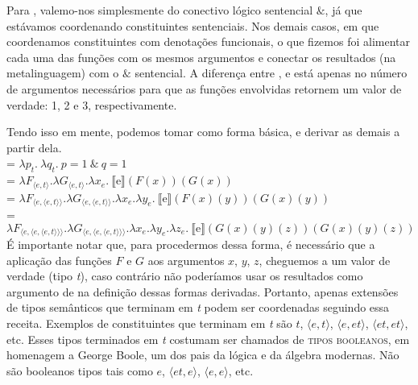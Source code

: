 \n Para , valemo-nos simplesmente do conectivo lógico
sentencial $\&$, já que estávamos coordenando constituintes
sentenciais. Nos demais casos, em que coordenamos constituintes com
denota\-çõ\-es funcionais, o que fizemos foi alimentar cada uma das
fun\-çõ\-es com os mesmos argumentos e conectar os resultados (na
metalinguagem) com o $\&$ sentencial. A diferen\-ça entre
,  e  está apenas no número de
argumentos necessários para que as fun\-çõ\-es
envolvidas retornem um valor de verdade: 1, 2 e 3, respectivamente. 

Tendo isso em mente, podemos tomar  como forma básica, e
derivar as demais a partir dela.\\

\n {} = $\lambda p_{t}.\ \lambda q_{t}.\ p=1\ \&\
q=1$\\

\n {} = $\lambda F_{\langle e,t\rangle}.\lambda G_{\langle
e,t\rangle}.\lambda x_{e}.\ \llbracket \text{e} \rrbracket (F(x))(G(x))$\\

\n {} = $\lambda F_{\langle e,\langle
e,t\rangle\rangle}.\lambda G_{\langle e,\langle
e,t\rangle\rangle}.\lambda x_{e}.\lambda y_{e}.\ \llbracket \text{e} \rrbracket (F(x)(y))(G(x)(y))$\\

\n {} = $\lambda F_{\langle e,\langle e, \langle
e,t\rangle\rangle\rangle}.\lambda G_{\langle e,\langle e, \langle
e,t\rangle\rangle\rangle}.\lambda x_{e}.\lambda y_{e}.\lambda
z_{e}.\ \llbracket \text{e} \rrbracket (G(x)(y)(z))(G(x)(y)(z))$\\

\n É importante notar que, para
procedermos dessa forma, é necessário que a aplicação das funções $F$ e $G$  aos argumentos $x$, $y$, $z$, cheguemos a um valor de verdade (tipo
\textit{t}), caso contrário não poderíamos usar os resultados como argumento de \den{e} na definição dessas formas derivadas. Portanto, apenas extensões de tipos semânticos
que terminam em \textit{t} podem ser coordenadas seguindo essa
receita. Exemplos de constituintes que terminam em \textit{t} são
$t$, $\langle e,t\rangle$, $\langle e,et\rangle$, $\langle
et,et\rangle$, etc. Esses tipos terminados em \textit{t}
costumam ser chamados de \textsc{tipos booleanos}, em homenagem a George Boole, um dos pais da lógica e da álgebra modernas. Não são
booleanos tipos tais como $e$, $\langle et,e\rangle$, $\langle
e,e\rangle$, etc.


